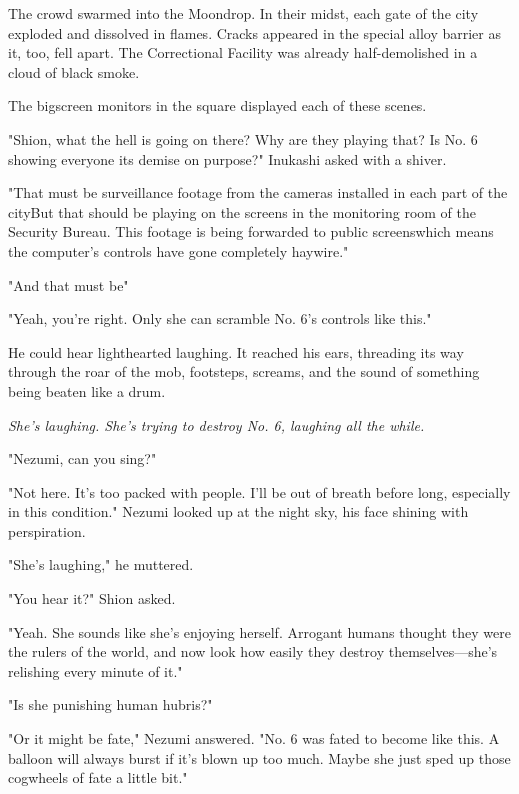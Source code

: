 The crowd swarmed into the Moondrop. In their midst, each gate of the
city exploded and dissolved in flames. Cracks appeared in the special
alloy barrier as it, too, fell apart. The Correctional Facility was
already half-demolished in a cloud of black smoke.

The bigscreen monitors in the square displayed each of these scenes.

"Shion, what the hell is going on there? Why are they playing that? Is
No. 6 showing everyone its demise on purpose?" Inukashi asked with a
shiver.

"That must be surveillance footage from the cameras installed in each
part of the city\el But that should be playing on the screens in the
monitoring room of the Security Bureau. This footage is being forwarded
to public screens\el which means the computer's controls have gone
completely haywire."

"And that must be\el "

"Yeah, you're right. Only she can scramble No. 6's controls like this."



He could hear lighthearted laughing. It reached his ears, threading its
way through the roar of the mob, footsteps, screams, and the sound of
something being beaten like a drum.



\emph{She's laughing. She's trying to destroy No. 6, laughing all the while.}

"Nezumi, can you sing?"

"\el Not here. It's too packed with people. I'll be out of breath before
long, especially in this condition." Nezumi looked up at the night sky,
his face shining with perspiration.

"She's laughing," he muttered.

"You hear it?" Shion asked.

"Yeah. She sounds like she's enjoying herself. Arrogant humans thought
they were the rulers of the world, and now look how easily they destroy
themselves---she's relishing every minute of it."

"Is she punishing human hubris?"

"Or it might be fate," Nezumi answered. "No. 6 was fated to become like
this. A balloon will always burst if it's blown up too much. Maybe she
just sped up those cogwheels of fate a little bit."

